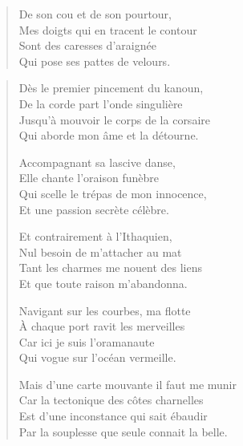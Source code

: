 \begin{verse}\quatrain
  De son cou et de son pourtour,\\  %
  Mes doigts  qui en tracent le contour\\  %
  Sont des caresses d’araignée\\  %
  Qui pose ses pattes de velours.
\end{verse}

\begin{verse}\quatrain
  Dès le premier pincement du kanoun,\\  
  De la corde part l’onde singulière\\  
  Jusqu’à mouvoir le corps de la corsaire\\  
  Qui aborde mon âme et la détourne.  

  Accompagnant sa lascive danse,\\  
  Elle chante l’oraison funèbre\\  
  Qui scelle le trépas de mon innocence,\\  
  Et une passion secrète célèbre.  

  Et contrairement à l’Ithaquien,\\  
  Nul besoin de m’attacher au mat\\  
  Tant les charmes me nouent des liens\\  
  Et que toute raison m’abandonna.  

  Navigant sur les courbes, ma flotte\\  
  À chaque port ravit les merveilles\\  
  Car ici je suis l’oramanaute\\  
  Qui vogue sur l’océan vermeille.  

  Mais d’une carte mouvante il faut me munir\\  
  Car la tectonique des côtes charnelles\\  
  Est d’une inconstance qui sait ébaudir\\  
  Par la souplesse que seule connait la belle.  
\end{verse}

